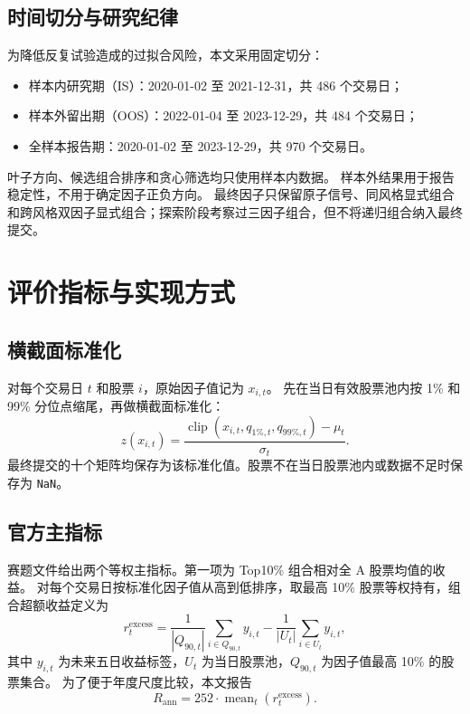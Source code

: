 \documentclass[UTF8,11pt,a4paper]{ctexart}
\begin{document}
\subsection{时间切分与研究纪律}

为降低反复试验造成的过拟合风险，本文采用固定切分：
\begin{itemize}[leftmargin=2em]
  \item 样本内研究期（IS）：2020-01-02 至 2021-12-31，共 486 个交易日；
  \item 样本外留出期（OOS）：2022-01-04 至 2023-12-29，共 484 个交易日；
  \item 全样本报告期：2020-01-02 至 2023-12-29，共 970 个交易日。
\end{itemize}

叶子方向、候选组合排序和贪心筛选均只使用样本内数据。
样本外结果用于报告稳定性，不用于确定因子正负方向。
最终因子只保留原子信号、同风格显式组合和跨风格双因子显式组合；探索阶段考察过三因子组合，但不将递归组合纳入最终提交。

\section{评价指标与实现方式}

\subsection{横截面标准化}

对每个交易日 $t$ 和股票 $i$，原始因子值记为 $x_{i,t}$。
先在当日有效股票池内按 1\% 和 99\% 分位点缩尾，再做横截面标准化：
\begin{equation}
z(x_{i,t}) = \frac{\operatorname{clip}(x_{i,t}, q_{1\%,t}, q_{99\%,t})-\mu_t}{\sigma_t}.
\end{equation}
最终提交的十个矩阵均保存为该标准化值。股票不在当日股票池内或数据不足时保存为 \texttt{NaN}。

\subsection{官方主指标}

赛题文件给出两个等权主指标。第一项为 Top10\% 组合相对全 A 股票均值的收益。
对每个交易日按标准化因子值从高到低排序，取最高 10\% 股票等权持有，组合超额收益定义为
\begin{equation}
r^{\mathrm{excess}}_t =
\frac{1}{|Q_{90,t}|}\sum_{i\in Q_{90,t}} y_{i,t}
- \frac{1}{|U_t|}\sum_{i\in U_t} y_{i,t},
\end{equation}
其中 $y_{i,t}$ 为未来五日收益标签，$U_t$ 为当日股票池，$Q_{90,t}$ 为因子值最高 10\% 的股票集合。
为了便于年度尺度比较，本文报告
\begin{equation}
R_{\mathrm{ann}} = 252 \cdot \operatorname{mean}_t(r^{\mathrm{excess}}_t).
\end{equation}
\end{document}
